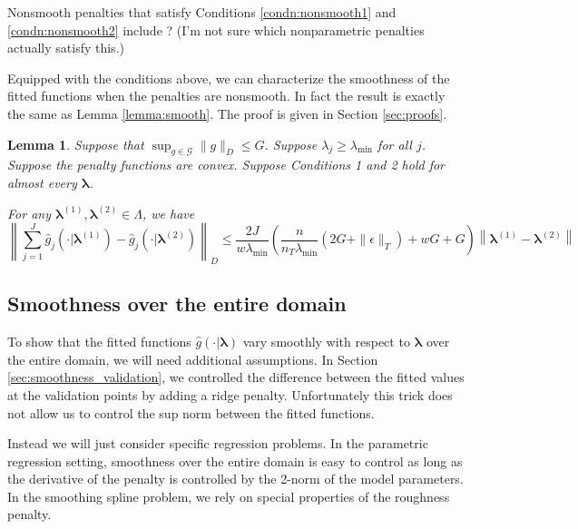 \documentclass[12pt]{article}
\newtheorem{lemma}{Lemma}
\begin{document}
Nonsmooth penalties that satisfy Conditions \ref{condn:nonsmooth1} and \ref{condn:nonsmooth2} include ? (I'm not sure which nonparametric penalties actually satisfy this.)

Equipped with the conditions above, we can characterize the smoothness of the fitted functions when the penalties are nonsmooth. In fact the result is exactly the same as Lemma \ref{lemma:smooth}. The proof is given in Section \ref{sec:proofs}.

\begin{lemma}
\label{lemma:nonsmooth}
Suppose that $\sup_{g\in\mathcal{G}}\|g\|_{D}\le G$.
Suppose $\lambda_j \ge \lambda_{\min}$ for all $j$.
Suppose the penalty functions are convex.
Suppose Conditions 1 and 2 hold for almost every $\boldsymbol{\lambda}$.


For any $\boldsymbol \lambda^{(1)}, \boldsymbol \lambda^{(2)} \in \Lambda$, we have
\[
\left \|\sum_{j=1}^{J}\hat{g}_{j}(\cdot| \boldsymbol \lambda^{(1)})-\hat{g}_{j}(\cdot| \boldsymbol \lambda^{(2)}) \right \|_{D}
\le
\frac{2J}{w\lambda_{\min}}
\left(\frac{n}{n_T \lambda_{\min} }\left(2G+\|\epsilon\|_{T}\right)+wG+G\right)
\left \|\boldsymbol \lambda^{(1)}- \boldsymbol \lambda^{(2)} \right \|
\]
\end{lemma}

\subsection{Smoothness over the entire domain}
\label{sec:smoothness_domain}

To show that the fitted functions $\hat{g}(\cdot | \boldsymbol \lambda)$ vary smoothly with respect to $\boldsymbol \lambda$ over the entire domain, we will need additional assumptions. In Section \ref{sec:smoothness_validation}, we controlled the difference between the fitted values at the validation points by adding a ridge penalty. Unfortunately this trick does not allow us to control the sup norm between the fitted functions.

Instead we will just consider specific regression problems. In the parametric regression setting, smoothness over the entire domain is easy to control as long as the derivative of the penalty is controlled by the 2-norm of the model parameters. In the smoothing spline problem, we rely on special properties of the roughness penalty.
\end{document}
